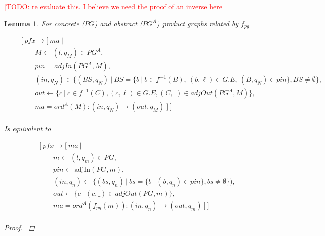 \documentclass[twocolumn, openany]{sig-alternate-10pt}
\newcommand{\todo}[1]{\textcolor{red}{[TODO: #1]}}
\newtheorem{lem}[thm]{Lemma}
\begin{document}
\todo{re evaluate this. I believe we need the proof of an inverse here}
\begin{lem}

  For concrete ($PG$) and abstract ($PG^A$) product graphs related by $f_{pg}$

  \[ \begin{array}{l}
     ~~~~~~~~~ [~ pfx \rightarrow [~ ma~\vert~ \\
     ~~~~~~~~~~~~~~~~~~ M \leftarrow (l,q_M) \in PG^A, \\
     ~~~~~~~~~~~~~~~~~~ pin = \mathit{adjIn}(PG^A,M), \\
     ~~~~~~~~~~~~~~~~~~ (in,q_N) \in \{(BS,q_N) ~\vert~ BS=\{b ~\vert~ b \in f^{-1}(B),~ (b,\ell) \in G.E,~ (B,q_N) \in pin \}, BS \neq \emptyset  \}, \\
     ~~~~~~~~~~~~~~~~~~ out \leftarrow \{ c ~\vert~ c \in f^{-1}(C), (c,\ell) \in G.E, (C,\_) \in \mathit{adjOut}(PG^A,M) \}, \\
     ~~~~~~~~~~~~~~~~~~ ma = ord^A(M) : (in,q_N) \rightarrow (out,q_M) ~] ~] \\
  \end{array} \]%

  Is equivalent to

  \[ \begin{array}{l}
     ~~~~~~~~~ [~ pfx \rightarrow [~ ma ~\vert~ \\
     ~~~~~~~~~~~~~~~~~~ m \leftarrow (l,q_m) \in PG, \\
     ~~~~~~~~~~~~~~~~~~ pin \leftarrow \text{adjIn}(PG,m), \\
     ~~~~~~~~~~~~~~~~~~ (in,q_n) \leftarrow \{ (bs,q_n) ~\vert~ bs=\{ b ~\vert~ (b,q_n) \in pin\}, bs \neq \emptyset \}), \\
     ~~~~~~~~~~~~~~~~~~ out \leftarrow \{ c ~\vert~ (c,\_) \in \mathit{adjOut}(PG,m) \}, \\
     ~~~~~~~~~~~~~~~~~~ ma = ord^A(f_{pg}(m)) : (in,q_n) \rightarrow (out,q_m) ~] ~] \\
  \end{array} \]%

  \begin{proof}
    $ $
    \vspace{.4em}


\end{proof}
\end{lem}
\end{document}
